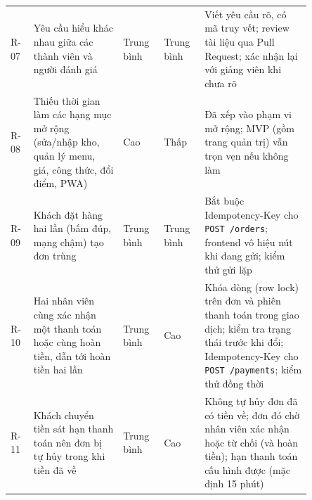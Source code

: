 {\begin{longtable}{@{}p{0.06\linewidth}p{0.26\linewidth}p{0.11\linewidth}p{0.11\linewidth}p{0.31\linewidth}@{}}
R-07 & Yêu cầu hiểu khác nhau giữa các thành viên và người đánh giá & Trung bình & Trung bình & Viết yêu cầu rõ, có mã truy vết; review tài liệu qua Pull Request; xác nhận lại với giảng viên khi chưa rõ \\[4pt]
R-08 & Thiếu thời gian làm các hạng mục mở rộng (sửa/nhập kho, quản lý menu, giá, công thức, đổi điểm, PWA) & Cao & Thấp & Đã xếp vào phạm vi mở rộng; MVP (gồm trang quản trị) vẫn trọn vẹn nếu không làm \\[4pt]
R-09 & Khách đặt hàng hai lần (bấm đúp, mạng chậm) tạo đơn trùng & Trung bình & Trung bình & Bắt buộc Idempotency-Key cho \texttt{POST /orders}; frontend vô hiệu nút khi đang gửi; kiểm thử gửi lặp \\[4pt]
R-10 & Hai nhân viên cùng xác nhận một thanh toán hoặc cùng hoàn tiền, dẫn tới hoàn tiền hai lần & Trung bình & Cao & Khóa dòng (row lock) trên đơn và phiên thanh toán trong giao dịch; kiểm tra trạng thái trước khi đổi; Idempotency-Key cho \texttt{POST /payments}; kiểm thử đồng thời \\[4pt]
R-11 & Khách chuyển tiền sát hạn thanh toán nên đơn bị tự hủy trong khi tiền đã về & Trung bình & Cao & Không tự hủy đơn đã có tiền về; đơn đó chờ nhân viên xác nhận hoặc từ chối (và hoàn tiền); hạn thanh toán cấu hình được (mặc định 15 phút) \\[4pt]
\end{longtable}}
